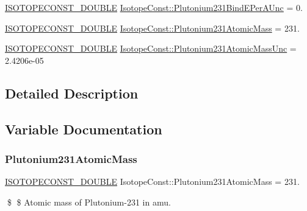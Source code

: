 \begin{DoxyCompactItemize}
\mbox{\hyperlink{group___isotope_const-_macros_ga8f45a7272ce02c0b4c65c44636ed719a}{I\+S\+O\+T\+O\+P\+E\+C\+O\+N\+S\+T\+\_\+\+D\+O\+U\+B\+LE}} \mbox{\hyperlink{group___isotope_const-_plutonium-_pu231_gafc99c7e7d8462c49b9c491c7b9b49bbb}{Isotope\+Const\+::\+Plutonium231\+Bind\+E\+Per\+A\+Unc}} = 0.
\item 
\mbox{\hyperlink{group___isotope_const-_macros_ga8f45a7272ce02c0b4c65c44636ed719a}{I\+S\+O\+T\+O\+P\+E\+C\+O\+N\+S\+T\+\_\+\+D\+O\+U\+B\+LE}} \mbox{\hyperlink{group___isotope_const-_plutonium-_pu231_ga45cc0aae9d9a92bd40be276c343e92be}{Isotope\+Const\+::\+Plutonium231\+Atomic\+Mass}} = 231.
\item 
\mbox{\hyperlink{group___isotope_const-_macros_ga8f45a7272ce02c0b4c65c44636ed719a}{I\+S\+O\+T\+O\+P\+E\+C\+O\+N\+S\+T\+\_\+\+D\+O\+U\+B\+LE}} \mbox{\hyperlink{group___isotope_const-_plutonium-_pu231_gab63370d315f7ea26cfad4f2e079a416a}{Isotope\+Const\+::\+Plutonium231\+Atomic\+Mass\+Unc}} = 2.\+4206e-\/05
\end{DoxyCompactItemize}


\subsection{Detailed Description}


\subsection{Variable Documentation}
\mbox{\label{group___isotope_const-_plutonium-_pu231_ga45cc0aae9d9a92bd40be276c343e92be}} 
\subsubsection{\texorpdfstring{Plutonium231\+Atomic\+Mass}{Plutonium231AtomicMass}}
{\footnotesize\ttfamily \mbox{\hyperlink{group___isotope_const-_macros_ga8f45a7272ce02c0b4c65c44636ed719a}{I\+S\+O\+T\+O\+P\+E\+C\+O\+N\+S\+T\+\_\+\+D\+O\+U\+B\+LE}} Isotope\+Const\+::\+Plutonium231\+Atomic\+Mass = 231.}

\$ \$ Atomic mass of Plutonium-\/231 in amu. \mbox{\label{group___isotope_const-_plutonium-_pu231_gab63370d315f7ea26cfad4f2e079a416a}} 
